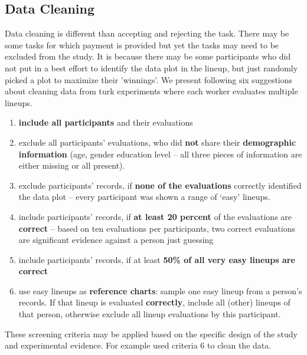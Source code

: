 \documentclass[11pt]{article}
\begin{document}
\subsection{Data Cleaning} Data cleaning is different than accepting and rejecting the task. There may be some tasks for which payment is provided but yet the tasks may need to be excluded from the study. It is because there may be some participants who did not put in a best effort to identify the data plot in the lineup, but just randomly picked a plot to maximize their 'winnings'. We present following six suggestions about cleaning data from turk experiments where each worker evaluates multiple lineups.  

\begin{enumerate}
\item {\bf include all participants} and their evaluations
\item exclude all participants' evaluations, who did {\bf not} share their {\bf demographic information} (age, gender education level -- all three pieces of information are either missing or all present).
\item exclude participants' records, if {\bf none of the evaluations}  correctly identified the data plot -- every participant was shown a range of `easy' lineups.
\item include participants' records, if   {\bf at least 20 percent} of the evaluations are {\bf correct}  -- based on ten evaluations per participants, two correct evaluations are significant evidence against a person just guessing
\item include participants' records, if at least {\bf 50\% of all very easy lineups are correct} 
\item use easy lineups as {\bf reference charts}: sample one easy lineup from a person's records. If that lineup is evaluated {\bf correctly}, include all (other) lineups of that person, otherwise exclude all lineup evaluations by this participant.
\end{enumerate}

These screening criteria may be applied based on the specific design of the study and experimental evidence. For example \cite{majumder:2013} used criteria 6 to clean the data.

\end{document}
